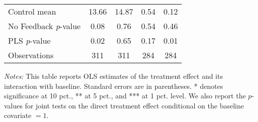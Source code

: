 \begin{table}[ht]
{\begin{threeparttable}
\begin{tabular}{l*{4}{c}}
Control mean    &    13.66         &    14.87         &     0.54         &     0.12         \\
No Feedback \emph{p}-value&     0.08         &     0.76         &     0.54         &     0.46         \\
PLS \emph{p}-value&     0.02         &     0.65         &     0.17         &     0.01         \\
Observations    &      311         &      311         &      284         &      284         \\
\bottomrule \end{tabular} \begin{tablenotes}[flushleft] \footnotesize \item \emph{Notes:} This table reports OLS estimates of the treatment effect and its interaction with baseline. Standard errors are in parentheses. * denotes significance at 10 pct., ** at 5 pct., and *** at 1 pct. level. We also report the \(p\)-values for joint tests on the direct treatment effect conditional on the baseline covariate $= 1$. \end{tablenotes} \end{threeparttable} } \end{table}

